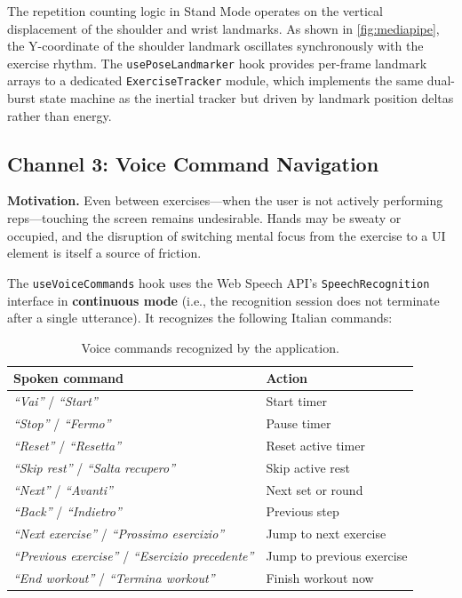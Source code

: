 \documentclass[11pt]{article}
\begin{document}
The repetition counting logic in Stand Mode operates on the vertical displacement of the shoulder and wrist landmarks. As shown in \cref{fig:mediapipe}, the Y-coordinate of the shoulder landmark oscillates synchronously with the exercise rhythm. The \texttt{usePoseLandmarker} hook provides per-frame landmark arrays to a dedicated \texttt{ExerciseTracker} module, which implements the same dual-burst state machine as the inertial tracker but driven by landmark position deltas rather than energy.

\subsection{Channel 3: Voice Command Navigation}

\textbf{Motivation.} Even between exercises—when the user is not actively performing reps—touching the screen remains undesirable. Hands may be sweaty or occupied, and the disruption of switching mental focus from the exercise to a UI element is itself a source of friction.

The \texttt{useVoiceCommands} hook uses the Web Speech API's \texttt{SpeechRecognition} interface in \textbf{continuous mode} (i.e., the recognition session does not terminate after a single utterance). It recognizes the following Italian commands:

\begin{table}[H]
\centering
\small
\begin{tabular}{p{4.2cm} p{2.8cm}}
\toprule
\textbf{Spoken command} & \textbf{Action} \\
\midrule
\textit{``Vai''} / \textit{``Start''} & Start timer \\
\textit{``Stop''} / \textit{``Fermo''} & Pause timer \\
\textit{``Reset''} / \textit{``Resetta''} & Reset active timer \\
\textit{``Skip rest''} / \newline \textit{``Salta recupero''} & Skip active rest \\
\textit{``Next''} / \textit{``Avanti''} & Next set or round \\
\textit{``Back''} / \textit{``Indietro''} & Previous step \\
\textit{``Next exercise''} / \newline \textit{``Prossimo esercizio''} & Jump to next exercise \\
\textit{``Previous exercise''} / \newline \textit{``Esercizio precedente''} & Jump to previous exercise \\
\textit{``End workout''} / \newline \textit{``Termina workout''} & Finish workout now \\
\bottomrule
\end{tabular}
\caption{Voice commands recognized by the application.}
\label{tab:voice}
\end{table}
\end{document}
